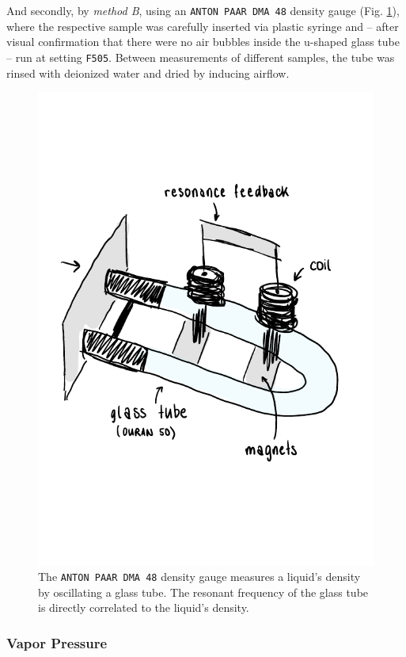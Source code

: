 And secondly, by \textit{method B}, using an \texttt{ANTON PAAR DMA 48} density gauge (Fig. \ref{fig:sketch_rho}), where the respective sample was carefully inserted via plastic syringe and – after visual confirmation that there were no air bubbles inside the u-shaped glass tube – run at setting \texttt{F505}. Between measurements of different samples, the tube was rinsed with deionized water and dried by inducing airflow.

\begin{figure}[H]
    \centering
    \includegraphics[width=.5\textwidth]{figures/sketch_density_meter.pdf}
    \caption{The \texttt{ANTON PAAR DMA 48} density gauge measures a liquid's density by oscillating a glass tube. The resonant frequency of the glass tube is directly correlated to the liquid's density.}
    \label{fig:sketch_rho}
\end{figure}



\subsubsection{Vapor Pressure}

